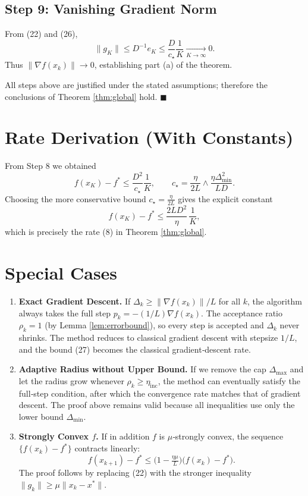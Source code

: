 \documentclass[11pt]{article}
\begin{document}
\subsection*{Step 9: Vanishing Gradient Norm}
From (22) and (26),
\[
\|g_{K}\|\le D^{-1}e_{K}\le \frac{D}{c_{\star}}\frac{1}{K}\xrightarrow[K\to\infty]{}0.
\]
Thus $\|\nabla f(x_{k})\|\to0$, establishing part (a) of the theorem.

All steps above are justified under the stated assumptions; therefore the
conclusions of Theorem \ref{thm:global} hold. $\blacksquare$

\section*{Rate Derivation (With Constants)}
From Step 8 we obtained
\[
f(x_{K})-f^{*}\le \frac{D^{2}}{c_{\star}}\frac{1}{K},
\qquad 
c_{\star}= \frac{\eta}{2L}\wedge\frac{\eta\Delta_{\min}^{2}}{LD}.
\]
Choosing the more conservative bound $c_{\star}= \frac{\eta}{2L}$ gives the
explicit constant
\[
f(x_{K})-f^{*}\le \frac{2L D^{2}}{\eta}\,\frac{1}{K},
\tag{27}
\]
which is precisely the rate (8) in Theorem \ref{thm:global}.

\section*{Special Cases}
\begin{enumerate}[label=\alph*.]
\item \textbf{Exact Gradient Descent.} If $\Delta_{k}\ge\|\nabla f(x_{k})\|/L$ for all $k$,
the algorithm always takes the full step $p_{k}=-(1/L)\nabla f(x_{k})$.
The acceptance ratio $\rho_{k}=1$ (by Lemma \ref{lem:errorbound}), so every step is
accepted and $\Delta_{k}$ never shrinks. The method reduces to classical
gradient descent with stepsize $1/L$, and the bound (27) becomes the classical
gradient‑descent rate.

\item \textbf{Adaptive Radius without Upper Bound.} If we remove the cap
$\Delta_{\max}$ and let the radius grow whenever $\rho_{k}\ge\eta_{\text{inc}}$,
the method can eventually satisfy the full‑step condition, after which the
convergence rate matches that of gradient descent. The proof above remains valid
because all inequalities use only the lower bound $\Delta_{\min}$.

\item \textbf{Strongly Convex $f$.} If in addition $f$ is $\mu$‑strongly convex,
the sequence $\{f(x_{k})-f^{*}\}$ contracts linearly:
\[
f(x_{k+1})-f^{*}\le\bigl(1-\tfrac{\eta\mu}{L}\bigr)\bigl(f(x_{k})-f^{*}\bigr).
\]
The proof follows by replacing (22) with the stronger inequality
$\|g_{k}\|\ge\mu\|x_{k}-x^{*}\|$.
\end{enumerate}
\end{document}
